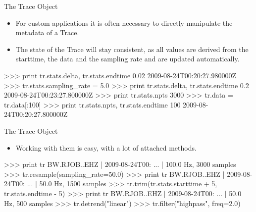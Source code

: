 \begin{frame}{The Trace Object}
 \begin{itemize}
     \item For custom applications it is often necessary to directly manipulate
         the metadata of a Trace.
     \item The state of the Trace will stay consistent, as all values are
         derived from the starttime, the data and the sampling rate and are
         updated automatically.
 \end{itemize}

\begin{myColorBox}{0.95}{}
\begin{python}
>>> print tr.stats.delta, tr.stats.endtime
0.02 2009-08-24T00:20:27.980000Z
>>> tr.stats.sampling_rate = 5.0
>>> print tr.stats.delta, tr.stats.endtime
0.2 2009-08-24T00:23:27.800000Z
>>> print tr.stats.npts
3000
>>> tr.data = tr.data[:100]
>>> print tr.stats.npts, tr.stats.endtime
100 2009-08-24T00:20:27.800000Z

\end{python}
\end{myColorBox}

\end{frame}

\begin{frame}{The Trace Object}
 \begin{itemize}
     \item Working with them is easy, with a lot of attached methods.
 \end{itemize}

\begin{myColorBox}{0.95}{}
\begin{python}
>>> print tr
BW.RJOB..EHZ | 2009-08-24T00: ... | 100.0 Hz, 3000 samples
>>> tr.resample(sampling_rate=50.0)
>>> print tr
BW.RJOB..EHZ | 2009-08-24T00: ... | 50.0 Hz, 1500 samples
>>> tr.trim(tr.stats.starttime + 5, tr.stats.endtime - 5)
>>> print tr
BW.RJOB..EHZ | 2009-08-24T00: ... | 50.0 Hz, 500 samples
>>> tr.detrend("linear")
>>> tr.filter("highpass", freq=2.0)

\end{python}
\end{myColorBox}

\end{frame}

